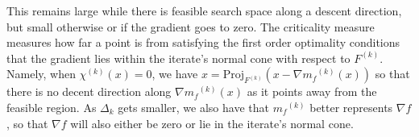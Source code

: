 \documentclass{article}
\theoremstyle{case}
\newcommand{\modelk}{{{m}_f}^{(k)}}
\newcommand{\feasiblek}{{F}^{(k)}}
\newcommand{\chik}{{\chi^{(k)}}}
\begin{document}
This remains large while there is feasible search space along a descent direction, but small otherwise or if the gradient goes to zero.
The criticality measure measures how far a point is from satisfying the first order optimality conditions that the gradient lies within the iterate's normal cone with respect to $\feasiblek$.
Namely, when $ \chik(x) = 0$, we have $x = \text{Proj}_{\feasiblek}(x - \nabla \modelk(x))$ so that there is no decent direction along $\nabla \modelk(x)$ as it points away from the feasible region.
As $\Delta_k$ gets smaller, we also have that $\modelk$ better represents $\nabla f$, so that $\nabla f$ will also either be zero or lie in the iterate's normal cone.





\end{document}
